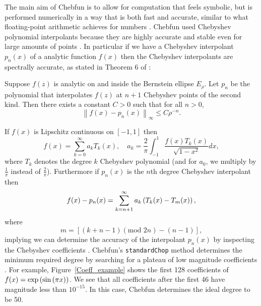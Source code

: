 The main aim of Chebfun is to allow for computation that feels symbolic, but is performed numerically in a way that is both fast and accurate, similar to what floating-point arithmetic achieves for numbers \cite{trefethen2015computing}. Chebfun used Chebyshev polynomial interpolants because they are highly accurate and stable even for large amounts of points \cite{mason2002chebyshev,Trefethen2013}.  In particular if we have a Chebyshev interpolant $p_n(x)$ of a analytic function $f(x)$ then the Chebyshev interpolants are spectrally accurate, as stated in Theorem 6 of \cite{trefethen2000spectral}:
\begin{thm} Suppose $f(z)$ is analytic on and inside the Bernstein ellipse $E_\rho$. Let $p_n$ be the polynomial that interpolates $f(z)$ at $n+1$ Chebyshev points of the second kind. Then there exists a constant $C>0$ such that for all $n>0$,
	$$ \left \| f(x)-p_n(x) \right \|_{\infty} \leq C  \rho^{-n}.$$
\end{thm}
If $f(x)$ is Lipschitz continuous on $[-1,1]$ then
\begin{equation}
f(x) = \sum_{k=0}^\infty a_k T_k(x), \quad a_k = \frac{2}{\pi} \int_{-1}^1 \frac{f(x) T_k(x)}{\sqrt{1-x^2}} dx,
\end{equation}
where $T_k$ denotes the degree $k$ Chebyshev polynomial (and for $a_0$, we multiply by $\frac{1}{\pi}$ instead of $\frac{2}{\pi}$). Furthermore if $p_n(x)$ is the $n$th degree Chebyshev interpolant then
\begin{equation}
f(x)-p_n(x) = \sum_{k=n+1}^{\infty} a_k \left( T_k(x)-T_m(x)\right),
\end{equation}
where
\begin{equation}
m = \left [ (k+n-1)(\text{mod }2n) - (n-1)\right ],
\end{equation}
implying we can determine the accuracy of the interpolant $p_n(x)$ by inspecting the Chebyshev coefficients \cite{Trefethen2013}. Chebfun's {\tt standardChop} method determines the minimum required degree by searching for a plateau of low magnitude coefficients \cite{Aurentz:2017:CCS:3034774.2998442}.  For example, Figure~\ref{Coeff_example} shows the first 128 coefficients of $f(x)=\exp \left( \sin \left( \pi x \right) \right)$. We see that all coefficients after the first 46 have magnitude less than $10^{-15}$. In this case, Chebfun determines the ideal degree to be 50.
